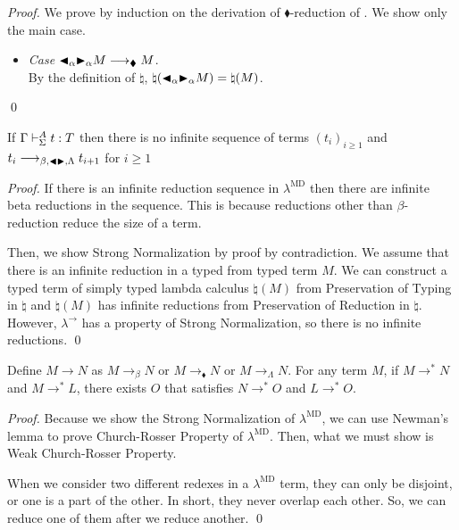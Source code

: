\begin{proof}
	We prove by induction on the derivation of $\blacklozenge$-reduction of \LMD.
	We show only the main case.
	\begin{itemize}
		\item \textit{Case} \( {\mathop{\blacktriangleleft}}_\alpha {\mathop{\blacktriangleright}}_\alpha M \longrightarrow_\blacklozenge M \).\\
		By the definition of $\natural$, \(\natural({\mathop{\blacktriangleleft}}_\alpha {\mathop{\blacktriangleright}}_\alpha M) = \natural(M)\).
	\end{itemize}
	\qed
\end{proof}
	
\begin{theorem}
	If $\Gamma\vdash_\Sigma^A t:T$ then there is no infinite sequence of terms $(t_i)_{i\ge1}$ and $t_i \longrightarrow_{\beta, {\mathop{\blacktriangleleft}} {\mathop{\blacktriangleright}},\Lambda} t_{i+1}$ for $i\ge 1$
\end{theorem}

\begin{proof}
If there is an infinite reduction sequence in $\lambda^{\text{MD}}$ 
then there are infinite beta reductions in the sequence.
This is because reductions other than $\beta$-reduction reduce the size of a term.
	
Then, we show Strong Normalization by proof by contradiction.
We assume that there is an infinite reduction in a typed \LMD from typed term $M$.
We can construct a typed term of simply typed lambda calculus $\natural(M)$ from Preservation of Typing in $\natural$ and
$\natural(M)$ has infinite reductions from Preservation of Reduction in $\natural$.
However, $\lambda^\to$ has a property of Strong Normalization, so there is no infinite reductions.
\qed\end{proof}
	
\begin{theorem}
	Define $M \longrightarrow N$ as $M \longrightarrow_{\beta} N$ or $M\longrightarrow_\blacklozenge N$ or  $M \longrightarrow_{\Lambda} N$.
	For any term $M$, if $M \longrightarrow^* N$ and $M \longrightarrow^* L$,
	there exists $O$ that satisfies $N \longrightarrow^* O$ and $L \longrightarrow^* O$.
\end{theorem}
	
\begin{proof}	
Because we show the Strong Normalization of $\lambda^{\text{MD}}$, we can use Newman's lemma to prove Church-Rosser Property of $\lambda^{\text{MD}}$.
Then, what we must show is Weak Church-Rosser Property.
	
When we consider two different redexes in a $\lambda^{\text{MD}}$ term, they can only be disjoint, or one is a part of the other.
In short, they never overlap each other.
So, we can reduce one of them after we reduce another.
\qed\end{proof}

